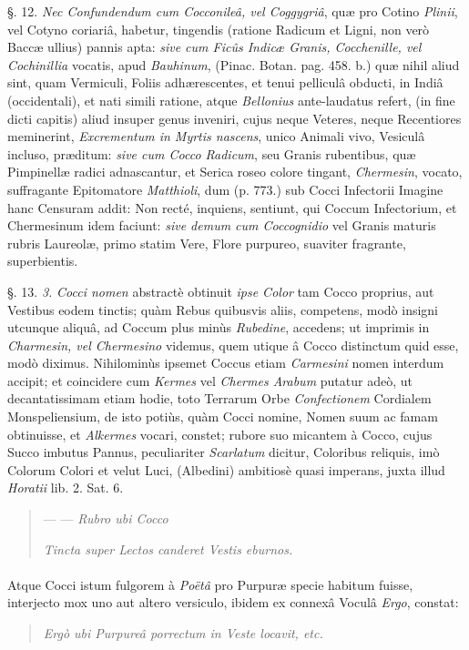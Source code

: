 \documentclass[a4paper, 11pt, oneside, polutonikogreek, german]{article}
\begin{document}
§. 12. \emph{Nec Confundendum cum Cocconileâ, vel Coggygriâ}, quæ pro Cotino \emph{Plinii}, vel Cotyno coriariâ, habetur, tingendis (ratione Radicum et Ligni, non verò Baccæ ullius) pannis apta: \emph{sive cum Ficûs Indicæ Granis, Cocchenille, vel Cochinillia} vocatis, apud \emph{Bauhinum}, (Pinac. Botan. pag. 458. b.) quæ nihil aliud sint, quam Vermiculi, Foliis adhærescentes, et tenui pelliculâ obducti, in Indiâ (occidentali), et nati simili ratione, atque \emph{Bellonius} ante-laudatus refert, (in fine dicti capitis) aliud insuper genus inveniri, cujus neque Veteres, neque Recentiores meminerint, \emph{Excrementum in Myrtis nascens}, unico Animali vivo, Vesiculâ incluso, præditum: \emph{sive cum Cocco Radicum}, seu Granis rubentibus, quæ Pimpinellæ radici adnascantur, et Serica roseo colore tingant, \emph{Chermesin}, vocato, suffragante Epitomatore \emph{Matthioli}, dum (p. 773.) sub Cocci Infectorii Imagine hanc Censuram addit: Non recté, inquiens, sentiunt, qui Coccum Infectorium, et Chermesinum idem faciunt: \emph{sive demum cum Coccognidio} vel Granis maturis rubris Laureolæ, primo statim Vere, Flore purpureo, suaviter fragrante, superbientis.

§. 13. \emph{3.} \emph{Cocci nomen} abstractè obtinuit \emph{ipse Color} tam Cocco proprius, aut Vestibus eodem tinctis; quàm Rebus quibusvis aliis, competens, modò insigni utcunque aliquâ, ad Coccum plus minùs \emph{Rubedine}, accedens; ut imprimis in \emph{Charmesin, vel Chermesino} videmus, quem utique â Cocco distinctum quid esse, modò diximus. Nihilominùs ipsemet Coccus etiam \emph{Carmesini} nomen interdum accipit; et coincidere cum \emph{Kermes} vel \emph{Chermes Arabum} putatur adeò, ut decantatissimam etiam hodie, toto Terrarum Orbe \emph{Confectionem} Cordialem Monspeliensium, de isto potiùs, quàm Cocci nomine, Nomen suum ac famam obtinuisse, et \emph{Alkermes} vocari, constet; rubore suo micantem à Cocco, cujus Succo imbutus Pannus, peculiariter \emph{Scarlatum} dicitur, Coloribus reliquis, imò Colorum Colori et velut Luci, (Albedini) ambitiosè quasi imperans, juxta illud \emph{Horatii} lib. 2. Sat. 6.
\begin{quotation}
--- --- \emph{Rubro ubi Cocco}

\emph{Tincta super Lectos canderet Vestis eburnos.}
\end{quotation}
\paragraph{}
Atque Cocci istum fulgorem à \emph{Poëtâ} pro Purpuræ specie habitum fuisse, interjecto mox uno aut altero versiculo, ibidem ex connexâ Voculâ \emph{Ergo}, constat:
\begin{quotation}
\emph{Ergò ubi Purpureâ porrectum in Veste locavit, etc.}
\end{quotation}
\end{document}
